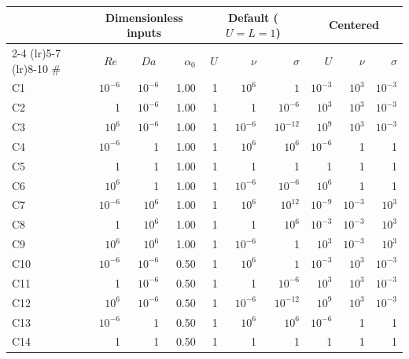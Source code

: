 \documentclass[11pt]{article}
\newcommand{\Reyn}{\operatorname{\mathit{Re}}}
\newcommand{\Damk}{\operatorname{\mathit{Da}}}
\begin{document}
\begin{table}[!htbp]
  \centering
  \footnotesize
  \begin{tabular}{l rrr rrr rrr}
    \toprule
    & \multicolumn{3}{c}{Dimensionless inputs} &
      \multicolumn{3}{c}{Default ($U=L=1$)} &
      \multicolumn{3}{c}{Centered} \\
    \cmidrule(lr){2-4} \cmidrule(lr){5-7} \cmidrule(lr){8-10}
    \# & $\Reyn$ & $\Damk$ & $\alpha_0$ & $U$ & $\nu$ & $\sigma$ & $U$ & $\nu$ & $\sigma$ \\
    \midrule
    C1  & $10^{-6}$ & $10^{-6}$ & 1.00 & 1 & $10^{6}$    & $1$         & $10^{-3}$ & $10^{3}$    & $10^{-3}$ \\
    C2  & 1         & $10^{-6}$ & 1.00 & 1 & 1           & $10^{-6}$   & $10^{3}$  & $10^{3}$    & $10^{-3}$ \\
    C3  & $10^{6}$  & $10^{-6}$ & 1.00 & 1 & $10^{-6}$   & $10^{-12}$  & $10^{9}$  & $10^{3}$    & $10^{-3}$ \\
    C4  & $10^{-6}$ & 1         & 1.00 & 1 & $10^{6}$    & $10^{6}$    & $10^{-6}$ & 1           & 1         \\
    C5  & 1         & 1         & 1.00 & 1 & 1           & 1           & 1         & 1           & 1         \\
    C6  & $10^{6}$  & 1         & 1.00 & 1 & $10^{-6}$   & $10^{-6}$   & $10^{6}$  & 1           & 1         \\
    C7  & $10^{-6}$ & $10^{6}$  & 1.00 & 1 & $10^{6}$    & $10^{12}$   & $10^{-9}$ & $10^{-3}$   & $10^{3}$  \\
    C8  & 1         & $10^{6}$  & 1.00 & 1 & 1           & $10^{6}$    & $10^{-3}$ & $10^{-3}$   & $10^{3}$  \\
    C9  & $10^{6}$  & $10^{6}$  & 1.00 & 1 & $10^{-6}$   & 1           & $10^{3}$  & $10^{-3}$   & $10^{3}$  \\
    \midrule
    C10 & $10^{-6}$ & $10^{-6}$ & 0.50 & 1 & $10^{6}$    & $1$         & $10^{-3}$ & $10^{3}$    & $10^{-3}$ \\
    C11 & 1         & $10^{-6}$ & 0.50 & 1 & 1           & $10^{-6}$   & $10^{3}$  & $10^{3}$    & $10^{-3}$ \\
    C12 & $10^{6}$  & $10^{-6}$ & 0.50 & 1 & $10^{-6}$   & $10^{-12}$  & $10^{9}$  & $10^{3}$    & $10^{-3}$ \\
    C13 & $10^{-6}$ & 1         & 0.50 & 1 & $10^{6}$    & $10^{6}$    & $10^{-6}$ & 1           & 1         \\
    C14 & 1         & 1         & 0.50 & 1 & 1           & 1           & 1         & 1           & 1         \\

\end{tabular}
\end{table}
\end{document}
